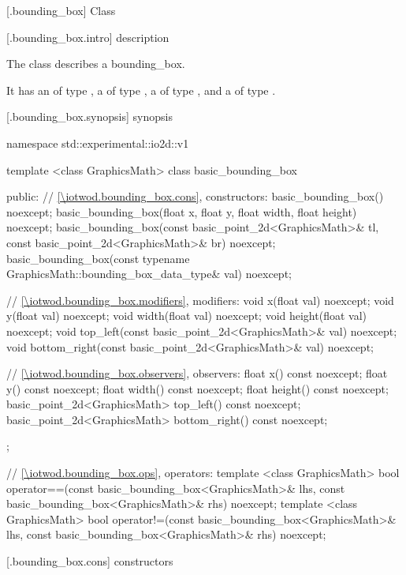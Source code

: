  [\iotwod.bounding_box] {Class }

 [\iotwod.bounding_box.intro] { description}

%
\pnum
The class  describes a bounding_box.

\pnum
It has an  of type , a  of type , a  of type , and a  of type .

 [\iotwod.bounding_box.synopsis] { synopsis}

\begin{codeblock}
namespace std::experimental::io2d::v1 {
  template <class GraphicsMath>
  class basic_bounding_box {
  public:
    // \ref{\iotwod.bounding_box.cons}, constructors:
    basic_bounding_box() noexcept;
    basic_bounding_box(float x, float y, float width, float height) noexcept;
    basic_bounding_box(const basic_point_2d<GraphicsMath>& tl,
      const basic_point_2d<GraphicsMath>& br) noexcept;
    basic_bounding_box(const typename GraphicsMath::bounding_box_data_type& val) noexcept;

    // \ref{\iotwod.bounding_box.modifiers}, modifiers:
    void x(float val) noexcept;
    void y(float val) noexcept;
    void width(float val) noexcept;
    void height(float val) noexcept;
    void top_left(const basic_point_2d<GraphicsMath>& val) noexcept;
    void bottom_right(const basic_point_2d<GraphicsMath>& val) noexcept;

    // \ref{\iotwod.bounding_box.observers}, observers:
    float x() const noexcept;
    float y() const noexcept;
    float width() const noexcept;
    float height() const noexcept;
    basic_point_2d<GraphicsMath> top_left() const noexcept;
    basic_point_2d<GraphicsMath> bottom_right() const noexcept;
  };

  // \ref{\iotwod.bounding_box.ops}, operators:
  template <class GraphicsMath>
  bool operator==(const basic_bounding_box<GraphicsMath>& lhs,
    const basic_bounding_box<GraphicsMath>& rhs) noexcept;
  template <class GraphicsMath>
  bool operator!=(const basic_bounding_box<GraphicsMath>& lhs,
    const basic_bounding_box<GraphicsMath>& rhs) noexcept;
}
\end{codeblock}

 [\iotwod.bounding_box.cons] { constructors}

